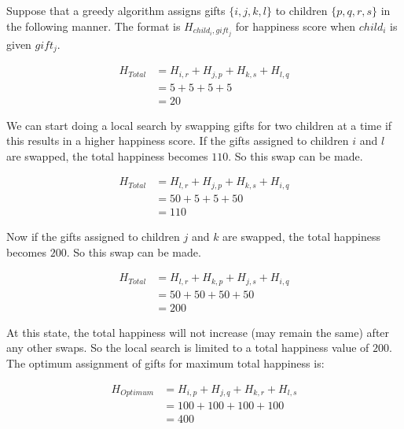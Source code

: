 \documentclass[addpoints]{exam}
\begin{document}
\begin{questions}
\begin{parts}
Suppose that a greedy algorithm assigns gifts $\{i,j,k,l\}$ to children $\{p,q,r,s\}$ in the following manner. The format is $H_{child_i, gift_j}$ for happiness score when $child_i$ is given $gift_j$.

\begin{equation*}
\begin{aligned}
H_{Total} &= H_{i,r}+H_{j,p}+H_{k,s}+H_{l,q}\\
&=5+5+5+5\\
&=20
\end{aligned}
\end{equation*}

We can start doing a local search by swapping gifts for two children at a time if this results in a higher happiness score. If the gifts assigned to children $i$ and $l$ are swapped, the total happiness becomes $110$. So this swap can be made. 

\begin{equation*}
\begin{aligned}
H_{Total} &= H_{l,r}+H_{j,p}+H_{k,s}+H_{i,q}\\
&=50+5+5+50\\
&=110
\end{aligned}
\end{equation*}

Now if the gifts assigned to children $j$ and $k$ are swapped, the total happiness becomes $200$. So this swap can be made. 

\begin{equation*}
\begin{aligned}
H_{Total} &= H_{l,r}+H_{k,p}+H_{j,s}+H_{i,q}\\
&=50+50+50+50\\
&=200
\end{aligned}
\end{equation*}


At this state, the total happiness will not increase (may remain the same) after any other swaps. So the local search is limited to a total happiness value of $200$. The optimum assignment of gifts for maximum total happiness is:

\begin{equation*}
\begin{aligned}
H_{Optimum} &= H_{i,p}+H_{j,q}+H_{k,r}+H_{l,s}\\
&=100+100+100+100\\
&=400
\end{aligned}
\end{equation*}


\end{parts}
\end{questions}
\end{document}
